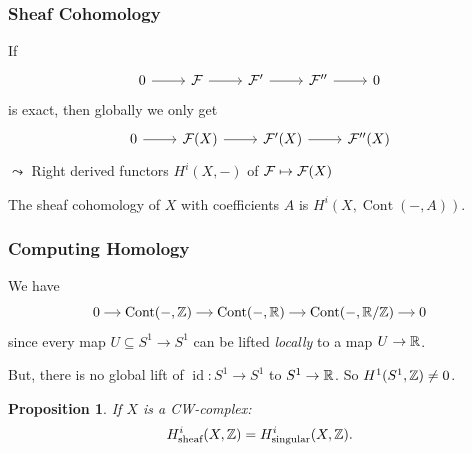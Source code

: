 \documentclass{beamer}
\newtheorem{proposition}{Proposition}
\DeclareMathOperator{\Cont}{Cont}
\DeclareMathOperator{\id}{id}
\begin{document}
\begin{frame}
    \frametitle{Sheaf Cohomology}

    If
    \begin{equation*}
        \begin{tikzcd}[ampersand replacement=\&]
            0 \rar \& \mcF \rar \& \mcF' \rar \& \mcF'' \rar \& 0
        \end{tikzcd}
    \end{equation*}
    is exact, then globally we only get
    \begin{equation*}
        \begin{tikzcd}[ampersand replacement=\&]
            0 \rar \& \mcF(X) \rar \& \mcF'(X) \rar \& \mcF''(X)
        \end{tikzcd}
    \end{equation*}
    \pause
    $\leadsto$ Right derived functors $H^i(X, -)$ of $\mathcal{F} \mapsto \mathcal{F}(X)$
    \begin{definition}
        The sheaf cohomology of $X$ with coefficients $A$ is $H^i(X, \Cont(- , A))$.
    \end{definition}

\end{frame}

\begin{frame}
    \frametitle{Computing Homology}

    We have
    \begin{equation*}
        \begin{tikzcd}[ampersand replacement=\&, sep=small, cramped]
            0 \rar \& \Cont(-, \bbZ) \rar \& \Cont(-, \bbR) \rar
            \& \Cont(-, \bbR/\bbZ) \rar \& 0
        \end{tikzcd}
    \end{equation*}
    since every map $U\subseteq S^1 \to S^1$ can be
    lifted \emph{locally} to a map $U \to \mathbb{R}$.

    \medskip
    But, there is no global lift of $\id\colon S^1 \to S^1$
    to $S^1 \to \mathbb{R}$.
    So $H^1(S^1, \mathbb{Z}) \neq 0$.

    \medskip
    \pause
    \begin{proposition}
        If $X$ is a CW-complex:
        \begin{equation*}
            H^i_{\text{sheaf}}(X, \mathbb{Z}) = H^i_{\text{singular}}(X, \mathbb{Z}).
        \end{equation*}
    \end{proposition}

\end{frame}
\end{document}
